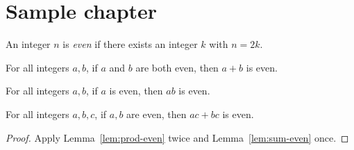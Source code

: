 
\chapter{Sample chapter}
\label{chap:sample}

\begin{definition}
\label{def:even}
An integer $n$ is \emph{even} if there exists an integer $k$ with $n = 2k$.
\end{definition}

\begin{lemma}
\label{lem:sum-even}
\leanok
{}
For all integers $a, b$, if $a$ and $b$ are both even, then $a + b$ is even.
\end{lemma}

\begin{lemma}
\label{lem:prod-even}
For all integers $a, b$, if $a$ is even, then $a b$ is even.
\end{lemma}

\begin{theorem}
\label{thm:sum-prod-even}
For all integers $a, b, c$, if $a, b$ are even, then $ac + bc$ is even.
\end{theorem}

\begin{proof}
Apply Lemma~\ref{lem:prod-even} twice and Lemma~\ref{lem:sum-even} once.
\end{proof}
